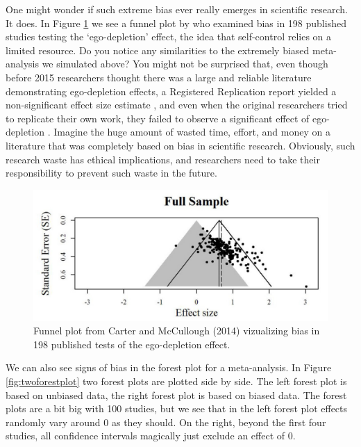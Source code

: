 \documentclass[
  oneside]{book}
\begin{document}
One might wonder if such extreme bias ever really emerges in scientific research. It does. In Figure \ref{fig:carterbias} we see a funnel plot by \citet{carter_publication_2014} who examined bias in 198 published studies testing the `ego-depletion' effect, the idea that self-control relies on a limited resource. Do you notice any similarities to the extremely biased meta-analysis we simulated above? You might not be surprised that, even though before 2015 researchers thought there was a large and reliable literature demonstrating ego-depletion effects, a Registered Replication report yielded a non-significant effect size estimate \citep{hagger_multilab_2016}, and even when the original researchers tried to replicate their own work, they failed to observe a significant effect of ego-depletion \citep{vohs_multisite_2021}. Imagine the huge amount of wasted time, effort, and money on a literature that was completely based on bias in scientific research. Obviously, such research waste has ethical implications, and researchers need to take their responsibility to prevent such waste in the future.



\begin{figure}

{\centering \includegraphics[width=1\linewidth]{images/carterfunnel} 

}

\caption{Funnel plot from Carter and McCullough (2014) vizualizing bias in 198 published tests of the ego-depletion effect.}\label{fig:carterbias}
\end{figure}

We can also see signs of bias in the forest plot for a meta-analysis. In Figure \ref{fig:twoforestplot} two forest plots are plotted side by side. The left forest plot is based on unbiased data, the right forest plot is based on biased data. The forest plots are a bit big with 100 studies, but we see that in the left forest plot effects randomly vary around 0 as they should. On the right, beyond the first four studies, all confidence intervals magically just exclude an effect of 0.
\end{document}
